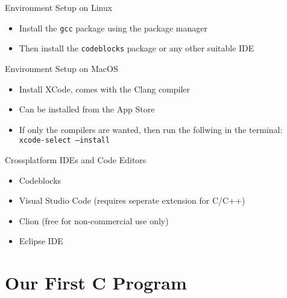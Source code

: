 \documentclass[12pt, aspectratio=169]{beamer}
\begin{document}
    \begin{frame}{Environment Setup on Linux}
        \begin{itemize}
            \item Install the \texttt{gcc} package using the package manager
            \item Then install the \texttt{codeblocks} package or any other suitable IDE
        \end{itemize}
    \end{frame}

    \begin{frame}{Environment Setup on MacOS}
        \begin{itemize}
            \item Install XCode, comes with the Clang compiler
            \item Can be installed from the App Store
            \item If only the compilers are wanted, then run the follwing in the terminal: \texttt{xcode-select~--install}
        \end{itemize}
    \end{frame}

    \begin{frame}{Crossplatform IDEs and Code Editors}
        \begin{itemize}
            \item Codeblocks
            \item Visual Studio Code (requires seperate extension for C/C++)
            \item Clion (free for non-commercial use only)
            \item Eclipse IDE
        \end{itemize}
    \end{frame}

    \section{Our First C Program}

\end{document}
